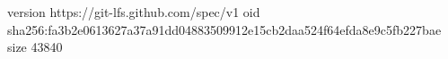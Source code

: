 version https://git-lfs.github.com/spec/v1
oid sha256:fa3b2e0613627a37a91dd04883509912e15cb2daa524f64efda8e9c5fb227bae
size 43840
